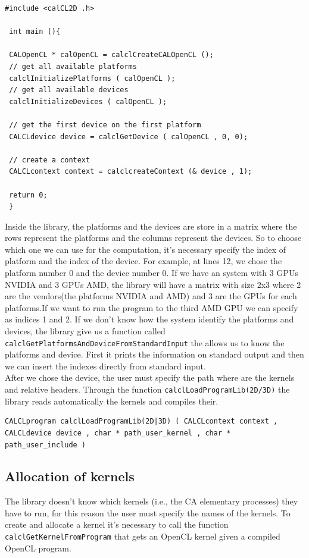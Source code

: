 \begin{lstlisting}
#include <calCL2D .h>

 int main (){

 CALOpenCL * calOpenCL = calclCreateCALOpenCL ();
 // get all available platforms
 calclInitializePlatforms ( calOpenCL );
 // get all available devices
 calclInitializeDevices ( calOpenCL );

 // get the first device on the first platform
 CALCLdevice device = calclGetDevice ( calOpenCL , 0, 0);

 // create a context
 CALCLcontext context = calclcreateContext (& device , 1);

 return 0;
 }
\end{lstlisting}

Inside the library, the platforms and the devices are store in a matrix where the
rows represent the platforms and the columns represent the devices. So to choose which one we can use for the computation,
it's necessary specify the index of platform and the index of the device. For
example, at lines 12, we chose the platform number
0 and the device number 0. If we have an system with 3 GPUs NVIDIA and 3 GPUs
AMD, the library will have a matrix with size 2x3 where 2 are the
vendors(the platforms NVIDIA and AMD) and 3 are the GPUs for each platforms.If we want to 	
run the program to the third AMD GPU we can specify as indices 1 and 2.
If we don't know how the system identify the platforms and devices, the
library give us a function called \verb'calclGetPlatformsAndDeviceFromStandardInput'
the allows us to know the platforms and device. First it prints the
information on standard output and then we can insert the indexes directly from
standard input.\\
After we chose the device, the user must specify the path where are the kernels
and relative headers.
Through the function \verb'calclLoadProgramLib(2D/3D)' the library reads automatically
the kernels and compiles their.
\begin{lstlisting}
CALCLprogram calclLoadProgramLib(2D|3D) ( CALCLcontext context ,
CALCLdevice device , char * path_user_kernel , char *
path_user_include )
\end{lstlisting}

\subsection{Allocation of kernels}

The library doesn't know which kernels (i.e., the CA elementary processes) they have to run, for this reason the
user must specify the names of the kernels.
To create and allocate a kernel it's necessary to call the function
\verb'calclGetKernelFromProgram' that gets an OpenCL kernel given a compiled OpenCL
program. 

